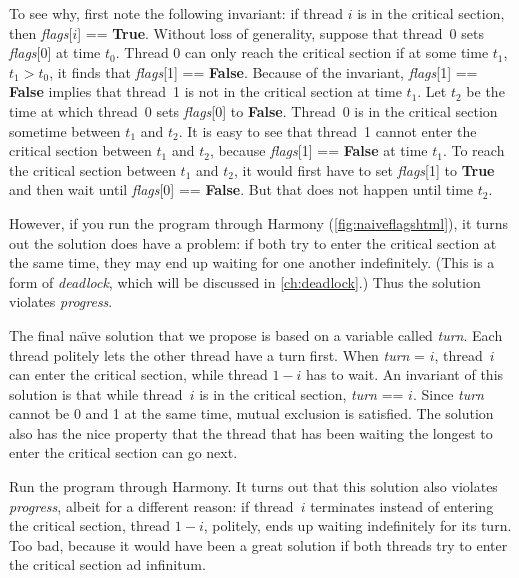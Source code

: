 \documentclass{report}
\begin{document}
To see why, first note the following invariant: if thread $i$ is in the
critical section, then \textit{flags}[$i$] == \textbf{True}.
Without loss of generality,
suppose that thread~0 sets \textit{flags}[0] at time $t_0$.
Thread 0 can only reach the critical section if at some time $t_1$,
$t_1 > t_0$, it finds that \textit{flags}[1] == \textbf{False}.
Because of the invariant, \textit{flags}[1] == \textbf{False} implies that
thread~1 is not in the critical section at time $t_1$.
Let $t_2$ be the time at which thread~0 sets \textit{flags}[0]
to \textbf{False}.  Thread~0 is in the critical section sometime
between $t_1$ and $t_2$.
It is easy to see that thread~1 cannot enter the critical section
between $t_1$ and $t_2$, because \textit{flags}[1] == \textbf{False} at
time $t_1$.  To reach the critical section between $t_1$ and $t_2$,
it would first have to set \textit{flags}[1] to \textbf{True} and
then wait until \textit{flags}[0] == \textbf{False}.  But that does not happen
until time $t_2$.

However, if you run the program through Harmony (\autoref{fig:naiveflagshtml}),
it turns out the solution
does have a problem: if both try to enter the critical section at the same
time, they may end up waiting for one another indefinitely.
(This is a form of \emph{deadlock}, which will be discussed in
\autoref{ch:deadlock}.)
Thus the
solution violates \emph{progress}.

The final na\"{\i}ve solution that we propose
is based on a variable called \textit{turn}.
Each thread politely lets the other thread have a turn first.
When \textit{turn} = $i$, thread~$i$ can
enter the critical section, while thread $1-i$ has to wait.
An invariant of this solution is that while thread~$i$ is in the critical
section, \textit{turn} == $i$.
Since \textit{turn} cannot be 0 and 1 at
the same time, mutual exclusion is satisfied.
The solution also has the nice property that the thread that has been waiting the
longest to enter the critical section can go next.

Run the program through Harmony.  It turns out that this solution also violates
\emph{progress}, albeit for a different reason:
if thread~$i$ terminates instead of entering the critical section,
thread $1-i$, politely, ends up waiting indefinitely for its turn.
Too bad, because it would have been a great solution if both
threads try to enter the critical section ad infinitum.
\end{document}
